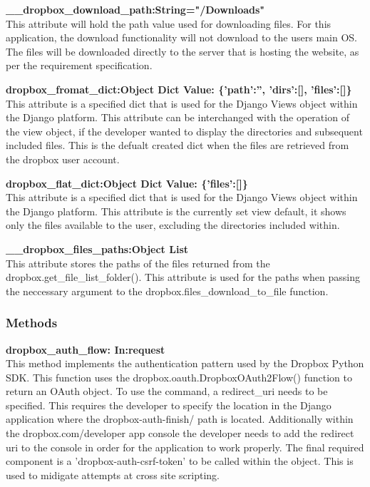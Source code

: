 \textbf{\_\_dropbox\_download\_path:String="/Downloads"} \\
    This attribute will hold the path value used for downloading files. For this application, the download functionality will not download to the users
    main OS. The files will be downloaded directly to the server that is hosting the website, as per the requirement specification. 

\textbf{dropbox\_fromat\_dict:Object Dict Value: \{'path':'', 'dirs':[], 'files':[]\}} \\
    This attribute is a specified dict that is used for the Django Views object within the Django platform. This attribute can be interchanged
    with the operation of the view object, if the developer wanted to display the directories and subsequent included files. This is the defualt 
    created dict when the files are retrieved from the dropbox user account.

\textbf{dropbox\_flat\_dict:Object Dict Value: \{'files':[]\}} \\
    This attribute is a specified dict that is used for the Django Views object within the Django platform. This attribute is the currently set 
    view default, it shows only the files available to the user, excluding the directories included within. 

\textbf{\_\_dropbox\_files\_paths:Object List} \\
    This attribute stores the paths of the files returned from the dropbox.get\_file\_list\_folder(). This attribute is used for the paths when 
    passing the neccessary argument to the dropbox.files\_download\_to\_file function. 

\subsubsection{Methods}
\textbf{dropbox\_auth\_flow: In:request} \\
    This method implements the authentication pattern used by the Dropbox Python SDK. This function uses the dropbox.oauth.DropboxOAuth2Flow() 
    function to return an OAuth object. To use the command, a redirect\_uri needs to be specified. This requires the developer to specify the 
    location in the Django application where the dropbox-auth-finish/ path is located. Additionally within the dropbox.com/developer app console
    the developer needs to add the redirect uri to the console in order for the application to work properly. The final required component is a 
    'dropbox-auth-csrf-token' to be called within the object. This is used to midigate attempts at cross site scripting.

